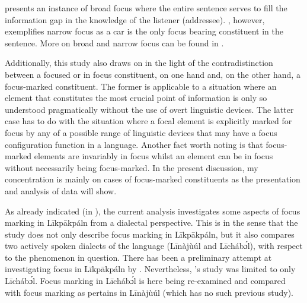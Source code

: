 \documentclass[output=paper,colorlinks,citecolor=brown]{langscibook}
\begin{document}
 presents an instance of broad focus where the entire sentence serves to fill the information gap in the knowledge of the listener (addressee). , however, exemplifies narrow focus as a car is the only focus bearing constituent in the sentence. More on broad and narrow focus can be found in \citet[96--97]{Hyman2010}.

Additionally, this study also draws on \citet[93]{VanPutten2016} in the light of the contradistinction between a focused or in focus constituent, on one hand and, on the other hand, a focus-marked constituent. The former is applicable to a situation where an element that constitutes the most crucial point of information is only so understood pragmatically without the use of overt linguistic devices. The latter case has to do with the situation where a focal element is explicitly marked for focus by any of a possible range of linguistic devices that may have a focus configuration function in a language. Another fact worth noting is that focus-marked elements are invariably in focus whilst an element can be in focus without necessarily being focus-marked. In the present discussion, my concentration is mainly on cases of focus-marked constituents as the presentation and analysis of data will show.

As already indicated (in ), the current analysis investigates some aspects of focus marking in Līkpākpáln from a dialectal perspective. This is in the sense that the study does not only describe focus marking in Līkpākpáln, but it also compares two actively spoken dialects of the language (Līnàjùúl and Līcháb\'{ɔ}l), with respect to the phenomenon in question. There has been a preliminary attempt at investigating focus in Līkpākpáln by \citet{Schwarz2009}. Nevertheless, \citeauthor{Schwarz2009}’s study was limited to only Līcháb\'{ɔ}l. Focus marking in Līcháb\'{ɔ}l is here being re-examined and compared with focus marking as pertains in Līnàjùúl (which has no such previous study).
\end{document}
